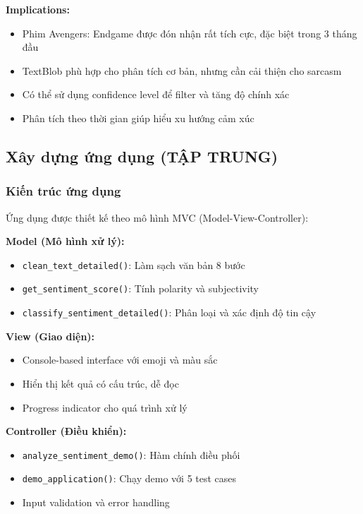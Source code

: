 \textbf{Implications:}
\begin{itemize}
    \item Phim Avengers: Endgame được đón nhận rất tích cực, đặc biệt trong 3 tháng đầu
    \item TextBlob phù hợp cho phân tích cơ bản, nhưng cần cải thiện cho sarcasm
    \item Có thể sử dụng confidence level để filter và tăng độ chính xác
    \item Phân tích theo thời gian giúp hiểu xu hướng cảm xúc
\end{itemize}

\subsection{Xây dựng ứng dụng (TẬP TRUNG)}

\subsubsection{Kiến trúc ứng dụng}

Ứng dụng được thiết kế theo mô hình MVC (Model-View-Controller):

\textbf{Model (Mô hình xử lý):}
\begin{itemize}
    \item \texttt{clean\_text\_detailed()}: Làm sạch văn bản 8 bước
    \item \texttt{get\_sentiment\_score()}: Tính polarity và subjectivity
    \item \texttt{classify\_sentiment\_detailed()}: Phân loại và xác định độ tin cậy
\end{itemize}

\textbf{View (Giao diện):}
\begin{itemize}
    \item Console-based interface với emoji và màu sắc
    \item Hiển thị kết quả có cấu trúc, dễ đọc
    \item Progress indicator cho quá trình xử lý
\end{itemize}

\textbf{Controller (Điều khiển):}
\begin{itemize}
    \item \texttt{analyze\_sentiment\_demo()}: Hàm chính điều phối
    \item \texttt{demo\_application()}: Chạy demo với 5 test cases
    \item Input validation và error handling
\end{itemize}

